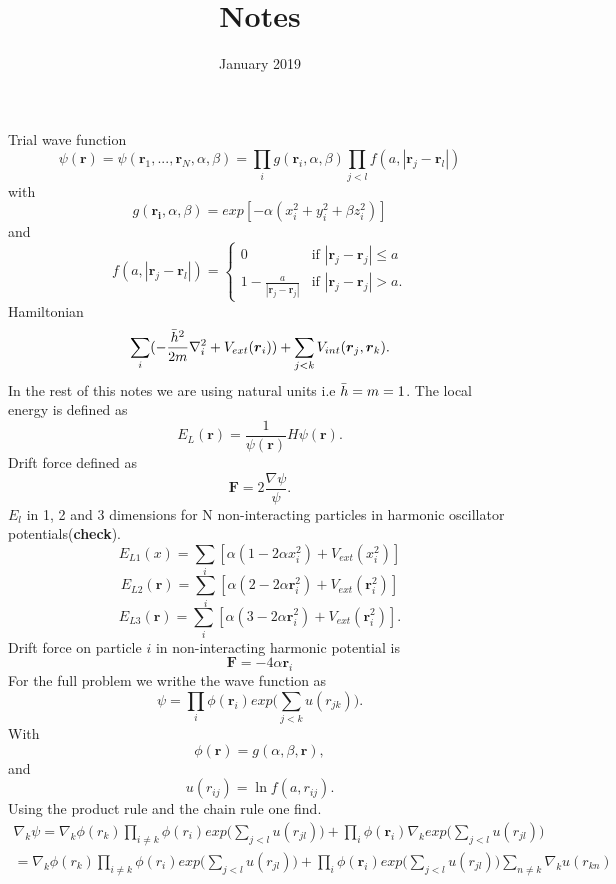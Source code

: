 \documentclass{article}
\title{Notes}
\author{ }
\date{January 2019}
\begin{document}
\maketitle

\section{}
Trial wave function \newline
$$\psi(\boldsymbol{r}) =  \psi(\boldsymbol{r}_1,...,\boldsymbol{r}_N, \alpha,\beta) = \prod_{i}g(\boldsymbol{r}_i,\alpha,\beta) \prod_{j<l}f(a,|\boldsymbol{r}_j -\boldsymbol{r}_l|)$$ \newline
with $$g(\boldsymbol{r_i},\alpha,\beta) = exp[-\alpha(x_i^2 + y_i^2 + \beta z_i^2)]$$ and \[ f(a,|\boldsymbol{r}_j -\boldsymbol{r}_l|) = \begin{cases}
    0 & \text{if } |\boldsymbol{r}_j - \boldsymbol{r}_j| \leq  a \\
    1 - \frac{a}{|\boldsymbol{r}_j - \boldsymbol{r}_j|} & \text{if } |\boldsymbol{r}_j - \boldsymbol{r}_j| >  a.
\end{cases}
\]
Hamiltonian 
$$\sum_i(-\frac{\Bar{h}^2}{2m}\nabla_i^2 + V_{ext}(\boldsymbol{r}_i)) + \sum_{j<k}V_{int}(\boldsymbol{r}_j,\boldsymbol{r}_k).$$
In the rest of this notes we are using natural units i.e $\Bar{h}=m=1$.
The local energy is defined as $$E_L(\boldsymbol{r}) = \frac{1}{\psi(\boldsymbol{r})} H \psi(\boldsymbol{r}).$$
Drift force defined as
$$\boldsymbol{F} = 2 \frac{\nabla \psi}{\psi}.$$
$E_l$ in 1, 2 and 3 dimensions for N non-interacting particles in harmonic oscillator potentials(\textbf{check}). 
$$E_{L1}(x) = \sum_i[ \alpha(1-2\alpha x_i^2) + V_{ext}(x_i^2)] $$
$$E_{L2}(\boldsymbol{r}) = \sum_i[ \alpha(2-2\alpha \boldsymbol{r}_i^2) + V_{ext}(\boldsymbol{r}_i^2)]$$
$$E_{L3}(\boldsymbol{r}) = \sum_i[ \alpha(3-2\alpha \boldsymbol{r}_i^2) + V_{ext}(\boldsymbol{r}_i^2)].$$
Drift force on particle $i$ in non-interacting harmonic potential is 
$$\boldsymbol{F} = -4\alpha \boldsymbol{r}_i$$
For the full problem we writhe the wave function as
$$\psi = \prod_i \phi(\boldsymbol{r}_i) exp\big(\sum_{j<k}u(r_{jk})\big). $$
With $$\phi(\boldsymbol{r}) = g(\alpha,\beta,\boldsymbol{r}),$$
and $$u(r_{ij}) = \ln{f(a,r_{ij})}.$$
Using the product rule and the chain rule one find. \newline
\begin{equation*}
\begin{split}
    \nabla_k \psi = \nabla_k \phi(r_k) \prod_{i \neq k} \phi(r_i)exp\big(\sum_{j<l}u(r_{jl})\big)  + \prod_i \phi(\boldsymbol{r}_i) \nabla_k exp\big(\sum_{j<l}u(r_{jl})\big) 
 \\= \nabla_k \phi(r_k) \prod_{i \neq k} \phi(r_i)exp\big(\sum_{j<l}u(r_{jl})\big) + \prod_i \phi(\boldsymbol{r}_i) exp\big(\sum_{j<l}u(r_{jl})\big) \sum_{n\neq k}\nabla_k u(r_{kn})
\end{split}
\end{equation*}
\end{document}
